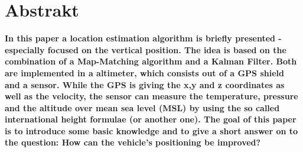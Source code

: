\chapter{Abstrakt}
\textbf{
In this paper a location estimation algorithm is briefly presented - especially focused on the vertical position. The idea is based on the combination of a Map-Matching algorithm and a Kalman Filter. Both are implemented in a altimeter, which consists out of a GPS shield and a sensor. While the GPS is giving the x,y and z coordinates as well as the velocity, the sensor can measure the temperature, pressure and the altitude over mean sea level (MSL) by using the so called international height formulae (or another one). The goal of this paper is to introduce some basic knowledge and to give a short answer on to the question: How can the vehicle’s positioning be improved?
}
